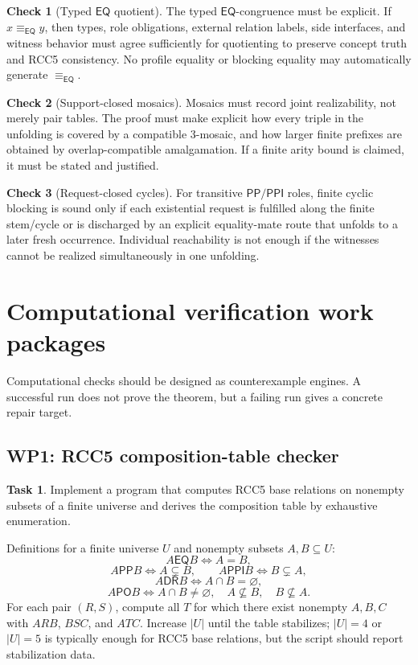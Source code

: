 \documentclass[11pt]{article}
\newcommand{\EQ}{\mathsf{EQ}}
\newcommand{\PP}{\mathsf{PP}}
\newcommand{\PPI}{\mathsf{PPI}}
\newcommand{\PO}{\mathsf{PO}}
\newcommand{\DR}{\mathsf{DR}}
\newcommand{\eqrel}{\equiv_{\EQ}}
\theoremstyle{definition}
\newtheorem{task}{Task}
\newtheorem{checkitem}{Check}
\theoremstyle{plain}
\begin{document}
\begin{checkitem}[Typed \(\EQ\) quotient]
The typed \(\EQ\)-congruence must be explicit.  If \(x\eqrel y\), then types, role obligations, external relation labels, side interfaces, and witness behavior must agree sufficiently for quotienting to preserve concept truth and RCC5 consistency.  No profile equality or blocking equality may automatically generate \(\eqrel\).
\end{checkitem}

\begin{checkitem}[Support-closed mosaics]
Mosaics must record joint realizability, not merely pair tables.  The proof must make explicit how every triple in the unfolding is covered by a compatible 3-mosaic, and how larger finite prefixes are obtained by overlap-compatible amalgamation.  If a finite arity bound is claimed, it must be stated and justified.
\end{checkitem}

\begin{checkitem}[Request-closed cycles]
For transitive \(\PP/\PPI\) roles, finite cyclic blocking is sound only if each existential request is fulfilled along the finite stem/cycle or is discharged by an explicit equality-mate route that unfolds to a later fresh occurrence.  Individual reachability is not enough if the witnesses cannot be realized simultaneously in one unfolding.
\end{checkitem}

\section{Computational verification work packages}

Computational checks should be designed as counterexample engines.  A successful run does not prove the theorem, but a failing run gives a concrete repair target.

\subsection{WP1: RCC5 composition-table checker}

\begin{task}
Implement a program that computes RCC5 base relations on nonempty subsets of a finite universe and derives the composition table by exhaustive enumeration.
\end{task}

Definitions for a finite universe \(U\) and nonempty subsets \(A,B\subseteq U\):
\[
A\EQ B \iff A=B,
\]
\[
A\PP B \iff A\subsetneq B,
\qquad
A\PPI B \iff B\subsetneq A,
\]
\[
A\DR B \iff A\cap B=\varnothing,
\]
\[
A\PO B \iff A\cap B\neq\varnothing,
\quad A\nsubseteq B,
\quad B\nsubseteq A.
\]
For each pair \((R,S)\), compute all \(T\) for which there exist nonempty \(A,B,C\) with \(A R B\), \(B S C\), and \(A T C\).  Increase \(|U|\) until the table stabilizes; \(|U|=4\) or \(|U|=5\) is typically enough for RCC5 base relations, but the script should report stabilization data.
\end{document}
